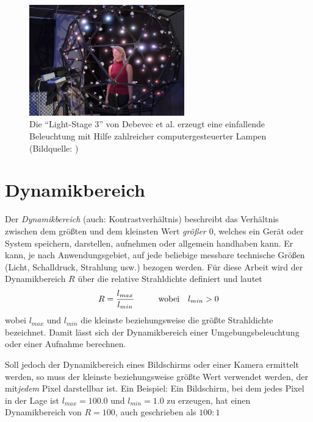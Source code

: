    \begin{figure}[h]
    \centering
    \includegraphics[width=0.6\textwidth]{../graphics/grundlagen/debevec_lightstage.png}
    \caption[Eine Light-Stage]{Die ``Light-Stage 3'' von Debevec et al. erzeugt eine einfallende Beleuchtung mit Hilfe zahlreicher computergesteuerter Lampen (Bildquelle: \cite{Debevec_2002}) }
    \label{fig:lightstage}
   \end{figure}

 

  \section{Dynamikbereich} \label{dynamikbereich}
   
    Der \emph{Dynamikbereich} (auch: Kontrastverhältnis) beschreibt das Verhältnis zwischen dem größten und dem kleinsten Wert \emph{größer $0$}, welches ein Gerät oder System speichern, darstellen, aufnehmen oder allgemein handhaben kann. 
    Er kann, je nach Anwendungsgebiet, auf jede beliebige messbare technische Größen (Licht, Schalldruck, Strahlung usw.) bezogen werden.
    Für diese Arbeit wird der Dynamikbereich $R$ über die relative Strahldichte definiert und lautet 
    \begin{equation}
      R = \frac{l_{max}}{l_{min}} \hspace{10mm} \text{wobei} \ \ \  l_{min} > 0
     \label{eq:dynamic_range} 
   \end{equation} 
    wobei  $l_{max}$ und $l_{min}$ die kleinste beziehungsweise die größte Strahldichte bezeichnet.
   Damit lässt sich der Dynamikbereich einer Umgebungsbeleuchtung oder einer Aufnahme berechnen.

   Soll jedoch der Dynamikbereich eines Bildschirms oder einer Kamera ermittelt werden, so muss der kleinste beziehungsweise größte Wert verwendet werden, der mit\emph{jedem} Pixel darstellbar ist.
    Ein Beispiel: Ein Bildschirm, bei dem jedes Pixel in der Lage ist $l_{max}=100.0$ und $l_{min}=1.0$ zu erzeugen, hat einen Dynamikbereich von $R=100$, auch geschrieben als $100:1$

